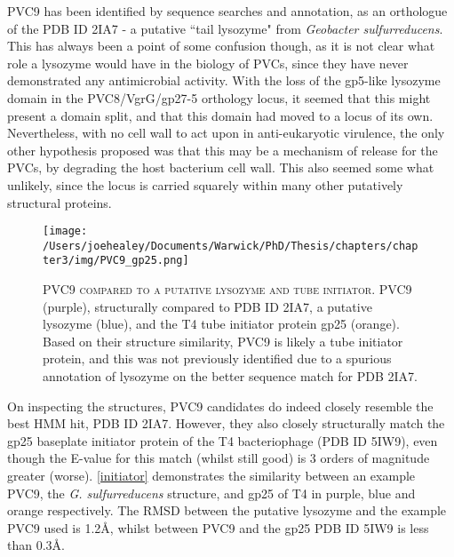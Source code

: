 PVC9 has been identified by sequence searches and annotation, as an orthologue of the PDB ID 2IA7 - a putative ``tail lysozyme" from \emph{Geobacter sulfurreducens}. This has always been a point of some confusion though, as it is not clear what role a lysozyme would have in the biology of PVCs, since they have never demonstrated any antimicrobial activity. With the loss of the gp5-like lysozyme domain in the PVC8/VgrG/gp27-5 orthology locus, it seemed that this might present a domain split, and that this domain had moved to a locus of its own. Nevertheless, with no cell wall to act upon in anti-eukaryotic virulence, the only other hypothesis proposed was that this may be a mechanism of release for the PVCs, by degrading the host bacterium cell wall. This also seemed some what unlikely, since the locus is carried squarely within many other putatively structural proteins.

\begin{figure}[h]
\thispagestyle{IHA-fancy-style}
\centering
\texttt{[image: /Users/joehealey/Documents/Warwick/PhD/Thesis/chapters/chapter3/img/PVC9\_gp25.png]}
\captionsetup{singlelinecheck=off, justification=justified, font=footnotesize, aboveskip=10pt}
\caption[PVC9 as a tube initiator candidate]{\textsc{\normalsize PVC9 compared to a putative lysozyme and tube initiator.}\vspace{0.1cm} \newline PVC9 (purple), structurally compared to PDB ID 2IA7, a putative lysozyme (blue), and the T4 tube initiator protein gp25 (orange). Based on their structure similarity, PVC9 is likely a tube initiator protein, and this was not previously identified due to a spurious annotation of lysozyme on the better sequence match for PDB 2IA7.}
	\label{initiator}
\end{figure}


On inspecting the structures, PVC9 candidates do indeed closely resemble the best HMM hit, PDB ID 2IA7. However, they also closely structurally match the gp25 baseplate initiator protein of the T4 bacteriophage (PDB ID 5IW9), even though the E-value for this match (whilst still good) is 3 orders of magnitude greater (worse). \vref{initiator} demonstrates the similarity between an example PVC9, the \emph{G. sulfurreducens} structure, and gp25 of T4 in purple, blue and orange respectively. The RMSD between the putative lysozyme and the example PVC9 used is 1.2\AA, whilst between PVC9 and the gp25 PDB ID 5IW9 is less than 0.3\AA.


